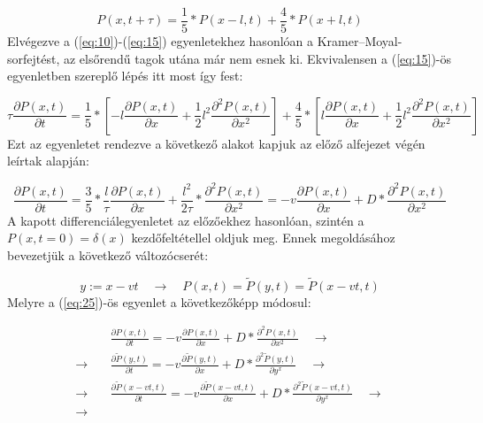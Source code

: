 \begin{equation} \label{eq:23}
    P \left( x, t + \tau \right)
    =
    \frac{1}{5} * P \left( x - l, t \right) + \frac{4}{5} * P \left( x + l, t \right)
\end{equation}
Elvégezve a (\ref{eq:10})-(\ref{eq:15}) egyenletekhez hasonlóan a Kramer--Moyal-sorfejtést, az elsőrendű tagok utána már nem esnek ki. Ekvivalensen a (\ref{eq:15})-ös egyenletben szereplő lépés itt most így fest:

\begin{equation} \label{eq:24}
    \tau \frac{\partial P \left( x, t \right)}{\partial t}
    =
    \frac{1}{5} * \left[ -l \frac{\partial P \left( x, t \right)}{\partial x} + \frac{1}{2} l^{2} \frac{\partial^{2} P \left( x, t \right)}{\partial x^{2}} \right] + \frac{4}{5} * \left[ l \frac{\partial P \left( x, t \right)}{\partial x} + \frac{1}{2} l^{2} \frac{\partial^{2} P \left( x, t \right)}{\partial x^{2}} \right]
\end{equation}
Ezt az egyenletet rendezve a következő alakot kapjuk az előző alfejezet végén leírtak alapján:

\begin{equation} \label{eq:25}
    \frac{\partial P \left( x, t \right)}{\partial t}
    =
    \frac{3}{5} * \frac{l}{\tau} \frac{\partial P \left( x, t \right)}{\partial x} + \frac{l^{2}}{2 \tau} * \frac{\partial^{2} P \left( x, t \right)}{\partial x^{2}}
    =
    - v \frac{\partial P \left( x, t \right)}{\partial x} + D * \frac{\partial^{2} P \left( x, t \right)}{\partial x^{2}}
\end{equation}
A kapott differenciálegyenletet az előzőekhez hasonlóan, szintén a $P \left( x, t=0 \right) = \delta \left( x \right)$ kezdőfeltétellel oldjuk meg. Ennek megoldásához bevezetjük a következő változócserét:

\begin{equation*}
    y := x -vt
    \quad \to \quad
    P \left( x, t \right) = \tilde{P} \left( y, t \right) = \tilde{P} \left( x - vt, t \right)
\end{equation*}
Melyre a (\ref{eq:25})-ös egyenlet a következőképp módosul:

\begin{align} \label{eq:26}
    &\frac{\partial P \left( x, t \right)}{\partial t}
    =
    - v \frac{\partial P \left( x, t \right)}{\partial x} + D * \frac{\partial^{2} P \left( x, t \right)}{\partial x^{2}} \quad \to \nonumber \\
    \to \quad &
    \frac{\partial \tilde{P} \left( y, t \right)}{\partial t}
    =
    - v \frac{\partial \tilde{P} \left( y, t \right)}{\partial x} + D * \frac{\partial^{2} \tilde{P} \left( y, t \right)}{\partial y^{x}} \quad \to \nonumber \\
    \to \quad &
    \frac{\partial \tilde{P} \left( x - vt, t \right)}{\partial t}
    =
    - v \frac{\partial \tilde{P} \left( x - vt, t \right)}{\partial x} + D * \frac{\partial^{2} \tilde{P} \left( x - vt, t \right)}{\partial y^{x}} \quad \to \nonumber \\
    \to \quad &
\end{align}